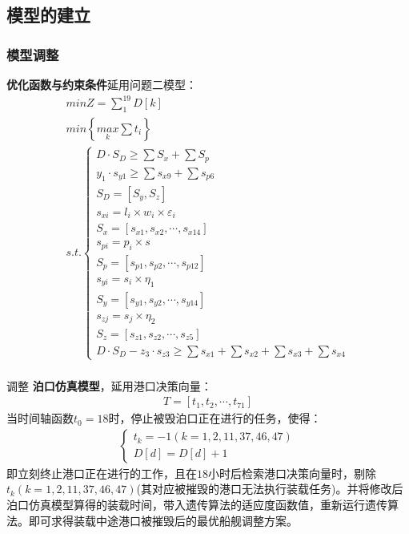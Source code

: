 \documentclass{whutmod}
\begin{document}
  \subsection{模型的建立}
    \subsubsection{模型调整}
    \textbf{优化函数与约束条件}延用问题二模型：
     	\begin{gather}
min Z=\sum _{1}^{19}D[k]\\
min \left \{ \underset{k}{max}\sum t_{i} \right \}\\
s.t.\left\{\begin{matrix}	 D\cdot S_{D}\geq \sum  S_{x} + \sum  S_{p}
\\ y_{1}\cdot s_{y1}\geq \sum s_{x9}+ \sum  s_{p6}
\\S_{D}=[S_{y}, S_{z}]
\\ s_{xi}=l_{i}\times w_{i} \times \varepsilon _{i}
\\S_{x}=[s_{x1},s_{x2},\cdots,s_{x14}]
\\s_{pi}=p_{i}\times s
\\S_{p}=[s_{p1},s_{p2},\cdots,s_{p12}]
\\     s_{yi}=s_{i}\times \eta_{1}
\\   S_{y}=[s_{y1},s_{y2},\cdots,s_{y14}]
\\      s_{zj}=s_{j}\times \eta_{2}
\\ S_{z}=[s_{z1},s_{z2},\cdots,s_{z5}]
\\	D \cdot S_{D} - z_{3} \cdot s_{z3} \geq  \sum s_{x1}+ \sum s_{x2}+\sum s_{x3}+ \sum s_{x4}
\end{matrix}\right. 
\end{gather}
     ~\\
     调整 \textbf{泊口仿真模型}，延用港口决策向量：
     \begin{gather*}
     T=[t_{1},t_{2},\cdots,t_{71}]
     \end{gather*}
     当时间轴函数$t_{0}=18$时，停止被毁泊口正在进行的任务，使得：
     \begin{gather}
     \left\{\begin{matrix}
     t_{k}=-1(k=1,2,11,37,46,47)\\ 
     D[d]=D[d]+1
     \end{matrix}\right.
     \end{gather}
     即立刻终止港口正在进行的工作，且在$18$小时后检索港口决策向量时，剔除$t_{k}(k=1,2,11,37,46,47)$(其对应被摧毁的港口无法执行装载任务)。并将修改后泊口仿真模型算得的装载时间，带入遗传算法的适应度函数值，重新运行遗传算法。即可求得装载中途港口被摧毁后的最优船舰调整方案。
\end{document}

